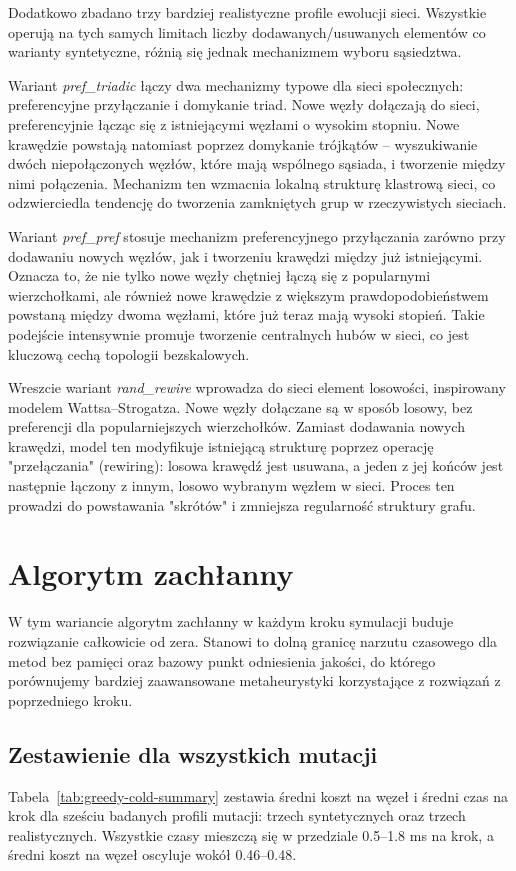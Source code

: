 Dodatkowo zbadano trzy bardziej realistyczne profile ewolucji sieci. Wszystkie operują na tych samych limitach liczby dodawanych/usuwanych elementów co warianty syntetyczne, różnią się jednak mechanizmem wyboru sąsiedztwa.

Wariant \emph{pref\_triadic} łączy dwa mechanizmy typowe dla sieci społecznych: preferencyjne przyłączanie i domykanie triad. Nowe węzły dołączają do sieci, preferencyjnie łącząc się z istniejącymi węzłami o wysokim stopniu. Nowe krawędzie powstają natomiast poprzez domykanie trójkątów -- wyszukiwanie dwóch niepołączonych węzłów, które mają wspólnego sąsiada, i tworzenie między nimi połączenia. Mechanizm ten wzmacnia lokalną strukturę klastrową sieci, co odzwierciedla tendencję do tworzenia zamkniętych grup w rzeczywistych sieciach.

Wariant \emph{pref\_pref} stosuje mechanizm preferencyjnego przyłączania zarówno przy dodawaniu nowych węzłów, jak i tworzeniu krawędzi między już istniejącymi. Oznacza to, że nie tylko nowe węzły chętniej łączą się z popularnymi wierzchołkami, ale również nowe krawędzie z większym prawdopodobieństwem powstaną między dwoma węzłami, które już teraz mają wysoki stopień. Takie podejście intensywnie promuje tworzenie centralnych hubów w sieci, co jest kluczową cechą topologii bezskalowych.

Wreszcie wariant \emph{rand\_rewire} wprowadza do sieci element losowości, inspirowany modelem Wattsa--Strogatza. Nowe węzły dołączane są w sposób losowy, bez preferencji dla popularniejszych wierzchołków. Zamiast dodawania nowych krawędzi, model ten modyfikuje istniejącą strukturę poprzez operację "przełączania" (rewiring): losowa krawędź jest usuwana, a jeden z jej końców jest następnie łączony z innym, losowo wybranym węzłem w sieci. Proces ten prowadzi do powstawania "skrótów" i zmniejsza regularność struktury grafu.


\section{Algorytm zachłanny}

W tym wariancie algorytm zachłanny w każdym kroku symulacji buduje rozwiązanie całkowicie od zera. Stanowi to dolną granicę narzutu czasowego dla metod bez pamięci oraz bazowy punkt odniesienia jakości, do którego porównujemy bardziej zaawansowane metaheurystyki korzystające z rozwiązań z poprzedniego kroku.

\subsection{Zestawienie dla wszystkich mutacji}
Tabela~\ref{tab:greedy-cold-summary} zestawia średni koszt na węzeł i średni czas na krok dla sześciu badanych profili mutacji: trzech syntetycznych oraz trzech realistycznych. Wszystkie czasy mieszczą się w przedziale 0.5--1.8 ms na krok, a średni koszt na węzeł oscyluje wokół 0.46--0.48.

